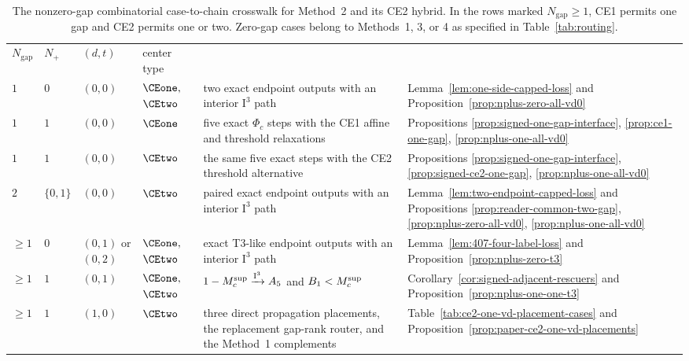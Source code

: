 \begin{table}[H]
\centering
\scriptsize
\setlength{\tabcolsep}{2pt}
\begin{tabular}{@{}
 >{\centering\arraybackslash}p{}
 >{\centering\arraybackslash}p{}
 >{\centering\arraybackslash}p{}
 >{\centering\arraybackslash}p{}
 >{\raggedright\arraybackslash}p{}
 >{\raggedright\arraybackslash}p{}@{}}
\toprule
\multicolumn{4}{c}{combinatorial case}
 &\multicolumn{1}{c}{retained chain}
 &\multicolumn{1}{c}{closing result}\\
\cmidrule(lr){1-4}
$N_{\mathrm{gap}}$&$N_+$&$(d,t)$&center type&&\\
\midrule
$1$&$0$&$(0,0)$&$\CEone,$ $\CEtwo$
 &two exact endpoint outputs with an interior $\mathrm I^3$ path
 &Lemma~\ref{lem:one-side-capped-loss} and
  Proposition~\ref{prop:nplus-zero-all-vd0}\\
\addlinespace[.35em]
$1$&$1$&$(0,0)$&$\CEone$
 &five exact $\Phi_c$ steps with the CE1 affine and threshold relaxations
 &Propositions \ref{prop:signed-one-gap-interface},
  \ref{prop:ce1-one-gap}, \ref{prop:nplus-one-all-vd0}\\
\addlinespace[.35em]
$1$&$1$&$(0,0)$&$\CEtwo$
 &the same five exact steps with the CE2 threshold alternative
 &Propositions \ref{prop:signed-one-gap-interface},
  \ref{prop:signed-ce2-one-gap}, \ref{prop:nplus-one-all-vd0}\\
\addlinespace[.35em]
$2$&$\{0,1\}$&$(0,0)$&$\CEtwo$
 &paired exact endpoint outputs with an interior $\mathrm I^3$ path
 &Lemma~\ref{lem:two-endpoint-capped-loss} and Propositions
  \ref{prop:reader-common-two-gap}, \ref{prop:nplus-zero-all-vd0},
  \ref{prop:nplus-one-all-vd0}\\
\addlinespace[.35em]
$\ge1$&$0$&$(0,1)$ or $(0,2)$&$\CEone,$ $\CEtwo$
 &exact T3-like endpoint outputs with an interior $\mathrm I^3$ path
 &Lemma~\ref{lem:407-four-label-loss} and
  Proposition~\ref{prop:nplus-zero-t3}\\
\addlinespace[.35em]
$\ge1$&$1$&$(0,1)$&$\CEone,$ $\CEtwo$
 &$1-M_c^{\rm sup}\xrightarrow{\mathrm I^3}A_5$ and
  $B_1<M_c^{\rm sup}$
 &Corollary~\ref{cor:signed-adjacent-rescuers} and
  Proposition~\ref{prop:nplus-one-one-t3}\\
\addlinespace[.35em]
$\ge1$&$1$&$(1,0)$&$\CEtwo$
 &three direct propagation placements, the replacement gap-rank router, and
  the Method~1 complements
 &Table~\ref{tab:ce2-one-vd-placement-cases} and
  Proposition~\ref{prop:paper-ce2-one-vd-placements}\\
\bottomrule
\end{tabular}
\caption{The nonzero-gap combinatorial case-to-chain crosswalk for Method~2
and its CE2 hybrid.  In the rows marked $N_{\mathrm{gap}}\ge1$, CE1 permits
one gap and CE2 permits one or two.  Zero-gap cases belong to Methods~1, 3,
or 4 as specified in Table~\ref{tab:routing}.}
\label{tab:strategy2-case-chain}
\end{table}

